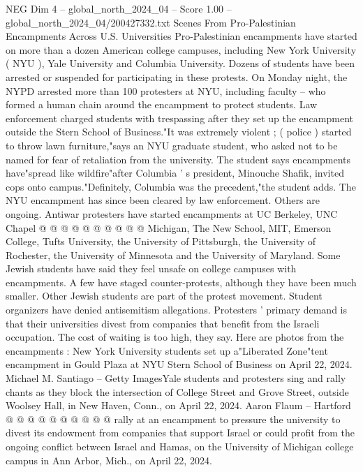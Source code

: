 \begin{textsample}{NEG Dim 4 – global\_north\_2024\_04 – Score 1.00 – global\_north\_2024\_04/200427332.txt}  \label{ex:f4_neg_098}
Scenes From Pro-Palestinian Encampments Across U.S.
Universities Pro-Palestinian encampments have started on more than a dozen American college campuses, including New York University ( NYU ), Yale University and Columbia University.
Dozens of students have been arrested or suspended for participating in these protests.
On Monday night, the NYPD arrested more than 100 protesters at NYU, including faculty -- who formed a human chain around the encampment to protect students.
Law enforcement charged students with trespassing after they set up the encampment outside the Stern School of Business."It was extremely violent ; ( police ) started to throw lawn furniture,"says an NYU graduate student, who asked not to be named for fear of retaliation from the university.
The student says encampments have"spread like wildfire"after Columbia ' s president, Minouche Shafik, invited cops onto campus."Definitely, Columbia was the precedent,"the student adds.
The NYU encampment has since been cleared by law enforcement.
Others are ongoing.
Antiwar protesters have started encampments at UC Berkeley, UNC Chapel @ @ @ @ @ @ @ @ @ @ Michigan, The New School, MIT, Emerson College, Tufts University, the University of Pittsburgh, the University of Rochester, the University of Minnesota and the University of Maryland.
Some Jewish students have said they feel unsafe on college campuses with encampments.
A few have staged counter-protests, although they have been much smaller.
Other Jewish students are part of the protest movement.
Student organizers have denied antisemitism allegations.
Protesters ' primary demand is that their universities divest from companies that benefit from the Israeli occupation.
The cost of waiting is too high, they say.
Here are photos from the encampments : New York University students set up a"Liberated Zone"tent encampment in Gould Plaza at NYU Stern School of Business on April 22, 2024.
Michael M.
Santiago -- Getty ImagesYale students and protesters sing and rally chants as they block the intersection of College Street and Grove Street, outside Woolsey Hall, in New Haven, Conn., on April 22, 2024.
Aaron Flaum -- Hartford @ @ @ @ @ @ @ @ @ @ rally at an encampment to pressure the university to divest its endowment from companies that support Israel or could profit from the ongoing conflict between Israel and Hamas, on the University of Michigan college campus in Ann Arbor, Mich., on April 22, 2024.

\end{textsample}
